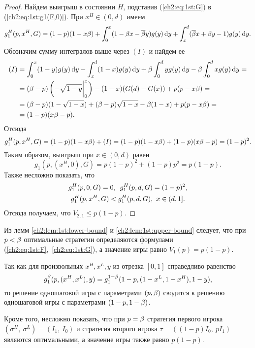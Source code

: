 {\begin{proof}
  Найдем выигрыш в состоянии $H$, подставив (\ref{ch2:eq:1st:G}) в (\ref{ch2:eq:1st:g1(F,0)}).
  При $x^H \in (0, d)$ имеем
  \begin{multline*}
    g^H_1(p, x^H, G) = (1 - p)(1 - x\beta) + \int_0^x (1 - \beta x - {\overline{\beta}} y) g(y) \mathop{}\!\mathrm{d} y + \int_x^d ({\overline{\beta}} x + \beta y - 1) g(y) \mathop{}\!\mathrm{d} y. 
  \end{multline*}
  Обозначим сумму интегралов выше через $(I)$ и найдем ее
  \begin{align*}
    (I)
    &= \int_0^x (1-y) g(y) \mathop{}\!\mathrm{d} y - \int_x^d (1-x) g(y) \mathop{}\!\mathrm{d} y + \beta \int_0^d y g(y) \mathop{}\!\mathrm{d} y - \beta \int_0^d x g(y) \mathop{}\!\mathrm{d} y = \\
    &= (\beta - p)\left(-\sqrt{1-y}\bigg|_0^x\right) - (1 - x)(G(d) - G(x)) + p(p - x\beta) = \\
    &= (\beta - p)(1 - \sqrt{1-x}) + (\beta - p)\sqrt{1-x} - \beta (1 - x) + p(p - x\beta) = \\
    &= (1 - p)(x\beta - p).
  \end{align*}
  Отсюда
  \begin{equation*}
    g^H_1(p, x^H, G) = (1 - p)(1 - x\beta) + (I) = (1 - p)(1 - x\beta) + (1 - p)(x\beta - p) = (1 - p)^2.
  \end{equation*}
  Таким образом, выигрыш при $x \in (0, d)$ равен
  \begin{equation*}
    g_1(p, (x^H, 0), G) = p (1 - p)^2 + (1 - p) p^2 = p (1 - p).
  \end{equation*}
  Также несложно показать, что 
  \begin{gather*}
    g^H_1(p, 0, G) = 0,\enskip
    g^H_1(p, d, G) = (1 - p)^2, \\
    g^H_1(p, x^H, G) < g^H_1(p, d, G),\ x \in (d, 1].
  \end{gather*}
  Отсюда получаем, что $V_{2,1} \leq p(1-p)$.
\end{proof}

Из лемм \ref{ch2:lem:1st:lower-bound} и \ref{ch2:lem:1st:upper-bound} следует, что при $p < \beta$ оптимальные стратегии определяются формулами (\ref{ch2:eq:1st:F},~\ref{ch2:eq:1st:G}), а значение игры равно $V_1(p) = p(1-p)$.

Так как для произвольных $x^H, x^L, y$ из отрезка $[0, 1]$ справедливо равенство
\[
  g^{\beta}_1(p, (x^H, x^L), y) = g^{1-\beta}_1(1 - p, (1 - x^L, 1 - x^H), 1 - y),
\]
то решение одношаговой игры с параметрами $(p, \beta)$ сводится к решению одношаговой игры с параметрами $(1 - p, 1 - \beta)$.

Кроме того, несложно показать, что при $p = \beta$ стратегия первого игрока $(\sigma^H,\ \sigma^L) = (I_1,\ I_0)$ и стратегия второго игрока $\tau = \left( (1-p) I_0,\ p I_1 \right)$ являются оптимальными, а значение игры также равно $p(1-p)$.

}
